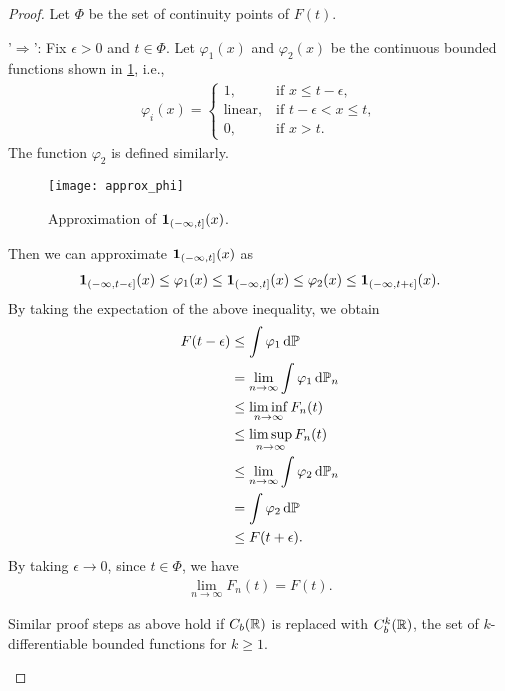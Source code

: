 \documentclass[12pt]{article}
\begin{document}
\begin{proof}
Let $\Phi$ be the set of continuity points of $F(t)$.

'$\Rightarrow$':  Fix $\epsilon > 0$ and $t\in\Phi$. Let $\varphi_1(x)$ and $\varphi_2(x)$ be the continuous bounded functions shown in \cref{wk9:fig:varphi}, i.e., 
\begin{align*}
\varphi_i(x) =
\begin{cases}
1, &\ \text{if $x \leq t-\epsilon$},\\
\text{linear}, &\ \text{if $t-\epsilon < x \leq t$},\\
0, &\ \text{if $x>t$}.
\end{cases}
\end{align*}
The function $\varphi_2$ is defined similarly.

\begin{figure}[!htb]
\centering
\texttt{[image: approx\_phi]} 
\caption{Approximation of ${\bf 1}_{\left(-\infty, t\right]}(x)$.}\label{wk9:fig:varphi} 
\end{figure}

Then we can approximate ${\bf 1}_{\left(-\infty, t\right]}(x)$ as
\begin{align*}
{\bf 1}_{\left(-\infty, t - \epsilon\right]}(x)
\leq \varphi_1(x)
\leq {\bf 1}_{\left(-\infty, t\right]}(x)
\leq \varphi_2(x)
\leq {\bf 1}_{\left(-\infty, t + \epsilon\right]}(x).
\end{align*}
By taking the expectation of the above inequality, we obtain
\begin{align*}
F(t - \epsilon)
& \leq \int \varphi_1 \ud\P \\
&= \lim_{n \to \infty} \int \varphi_1 \ud\P_n \\
& \leq \liminf_{n \to \infty} F_n(t) \\
& \leq \limsup_{n \to \infty} F_n(t) \\
& \leq \lim_{n \to \infty} \int \varphi_2 \ud\P_n \\
& = \int \varphi_2 \ud\P \\
& \leq F(t + \epsilon).
\end{align*}
By taking $\epsilon \to 0$, since $t\in\Phi$, we have
\begin{align*}
\lim_{n \to \infty} F_n(t) = F(t).
\end{align*}
%
\begin{Remark}
Similar proof steps as above hold if $C_b(\mathbb{R})$ is replaced with $C_b^k(\mathbb{R})$, the set of $k$-differentiable bounded functions for $k\geq1$.
\end{Remark}


\end{proof}
\end{document}
